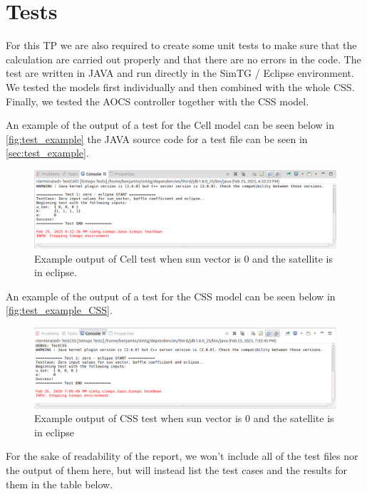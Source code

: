 \section{Tests}
\label{sec:Tests}

For this TP we are also required to create some unit tests to make sure that the calculation are carried out properly and that there are no errors in the code. 
The test are written in JAVA and run directly in the SimTG / Eclipse environment.
We tested the models first individually and then combined with the whole CSS. 
Finally, we tested the AOCS controller together with the CSS model.

An example of the output of a test for the Cell model can be seen below in \autoref{fig:test_example} the JAVA source code for a test file can be seen in \autoref{sec:test_example}.

\begin{figure}[H]
    \centering
    \includegraphics[width=1\linewidth]{doc//Graphics/test_example.png}
    \caption{Example output of Cell test when sun vector is 0 and the satellite is in eclipse.}
    \label{fig:test_example}
\end{figure}

An example of the output of a test for the CSS model can be seen below in \autoref{fig:test_example_CSS}.

\begin{figure}[H]
    \centering
    \includegraphics[width=1\linewidth]{doc//Graphics/test_example_CSS.png}
    \caption{Example output of CSS test when sun vector is 0 and the satellite is in eclipse}
    \label{fig:test_example_CSS}
\end{figure}


For the sake of readability of the report, we won't include all of the test files nor the output of them here, but will instead list the test cases and the results for them in the table below.


